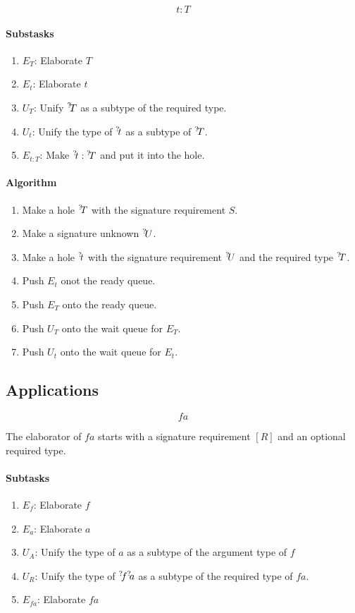 $$ t : T $$

\paragraph{Substasks}
\begin{enumerate}
    \item $E_T$: Elaborate $T$
    \item $E_t$: Elaborate $t$
    \item $U_T$: Unify ${{}^? \kern-0.2em T}$ as a subtype of the required type.
    \item $U_t$: Unify the type of ${{}^? \kern-0.2em t}$ as a subtype of ${{}^? \kern-0.2em T}$.
    \item $E_{t:T}$: Make ${{}^? \kern-0.2em t}: {{}^? \kern-0.2em T}$ and put it into the hole.
\end{enumerate}

\paragraph{Algorithm}
\begin{enumerate}
    \item Make a hole ${{}^? \kern-0.2em T}$ with the signature requirement $S$.
    \item Make a signature unknown ${{}^? \kern-0.2em U}$.
    \item Make a hole ${{}^? \kern-0.2em t}$ with the signature requirement ${{}^? \kern-0.2em U}$ and the
        required type ${{}^? \kern-0.2em T}$.

    \item Push $E_t$ onot the ready queue.
    \item Push $E_T$ onto the ready queue.
    \item Push $U_T$ onto the wait queue for $E_T$.
    \item Push $U_t$ onto the wait queue for $E_t$.
\end{enumerate}








\subsection{Applications}

$$ f a$$


The elaborator of $f a$ starts with a signature requirement $[R]$ and
an optional required type.

\paragraph{Subtasks}
\begin{enumerate}
    \item $E_f$: Elaborate $f$
    \item $E_a$: Elaborate $a$
    \item $U_{A}$: Unify the type of $a$ as a subtype of the argument type of
        $f$
    \item $U_{R}$: Unify the type of ${{}^? \kern-0.2em f} {{}^? \kern-0.2em a}$ as a subtype of the
        required type of $fa$.
    \item $E_{fa}$: Elaborate $fa$
\end{enumerate}

